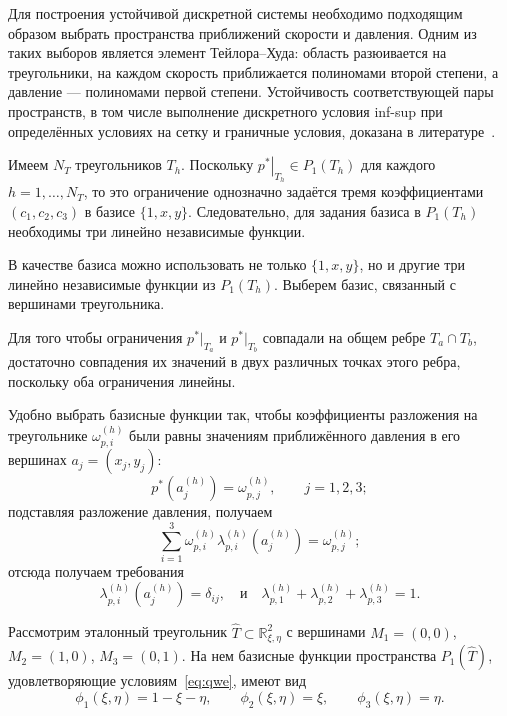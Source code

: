 \documentclass[a4paper,14pt]{extarticle}
\begin{document}
Для построения устойчивой дискретной системы необходимо
подходящим образом выбрать пространства приближений скорости
и давления. Одним из таких выборов является элемент
Тейлора--Худа: область разюивается на треугольники, на каждом скорость приближается полиномами второй степени, а давление --- полиномами первой
степени. Устойчивость соответствующей пары пространств,
в том числе выполнение дискретного условия inf-sup при
определённых условиях на сетку и граничные условия,
доказана в литературе~\cite{taylor_hood}.

Имеем $N_T$ треугольников $T_h$. Поскольку
$\left.p^*\right|_{T_h}\in P_1(T_h)$ для каждого
$h=1,\ldots,N_T$, то это ограничение однозначно задаётся
тремя коэффициентами $(c_1,c_2,c_3)$ в базисе $\{1,x,y\}$.
Следовательно, для задания базиса в $P_1(T_h)$ необходимы
три линейно независимые функции.

В качестве базиса можно использовать не только $\{1,x,y\}$,
но и другие три линейно независимые функции из $P_1(T_h)$.
Выберем базис, связанный с вершинами треугольника.


Для того чтобы ограничения $p^*|_{T_a}$ и $p^*|_{T_b}$
совпадали на общем ребре $T_a\cap T_b$, достаточно
совпадения их значений в двух различных точках этого ребра,
поскольку оба ограничения линейны.

Удобно выбрать базисные функции так, чтобы коэффициенты
разложения на треугольнике $\omega_{p,i}^{(h)}$ были равны
значениям приближённого давления в его вершинах $a_j = (x_j, y_j)$:
\begin{equation}
	p^*\left(a_j^{(h)}\right)
	=
	\omega_{p,j}^{(h)},
	\qquad j=1,2,3;
\end{equation}
подставляя разложение давления, получаем
\begin{equation}
	\sum_{i=1}^{3}\omega_{p,i}^{(h)}\lambda_{p,i}^{(h)}(a_j^{(h)})
	=\omega_{p,j}^{(h)};
\end{equation}
	отсюда получаем требования
\begin{equation}
		\lambda_{p,i}^{(h)}(a_j^{(h)})=\delta_{ij},\quad \text{и} \quad
		\lambda_{p,1}^{(h)}+	\lambda_{p,2}^{(h)}+	\lambda_{p,3}^{(h)} = 1.
\end{equation}

\begin{tcolorbox}
		Рассмотрим эталонный треугольник
		$\widehat{T}\subset\mathbb{R}^2_{\xi,\eta}$
		с вершинами
		$M_1=(0,0)$, $M_2=(1,0)$, $M_3=(0,1)$.
		На нем базисные функции
		пространства $P_1(\widehat{T})$,
		удовлетворяющие условиям~\eqref{eq:qwe},
		имеют вид
		\vspace{-8pt}
		\begin{equation}
			\phi_1(\xi,\eta)=1-\xi-\eta,\qquad
			\phi_2(\xi,\eta)=\xi,\qquad
			\phi_3(\xi,\eta)=\eta.
		\end{equation}
	\end{tcolorbox}
	
\end{document}
